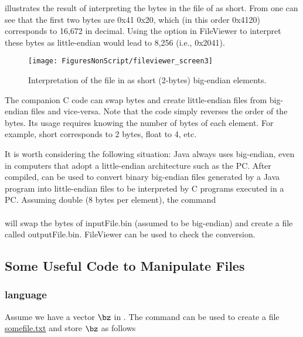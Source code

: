  illustrates the result of interpreting the bytes in the file of  as short. From  one can see that the first two bytes are 0x41 0x20, which (in this order 0x4120) corresponds to 16,672 in decimal. Using the option in FileViewer to interpret these bytes as little-endian would lead to 8,256 (i.e., 0x2041).

\begin{figure}
	\centering
		\texttt{[image: FiguresNonScript/fileviewer\_screen3]}		
	\caption{Interpretation of the file in  as short (2-bytes) big-endian elements.\label{fig:fileviewer_screen3}}
\end{figure}

The companion C code  can swap bytes and create little-endian files from big-endian files and vice-versa. Note that the code simply reverses the order of the bytes. Its usage requires knowing the number of bytes of each element. For example, short corresponds to 2 bytes, float to 4, etc.

It is worth considering the following situation: Java always uses big-endian, even in computers that adopt a little-endian architecture such as the PC. After compiled,  can be used to convert binary big-endian files generated by a Java program into little-endian files to be interpreted by C programs executed in a PC. Assuming double (8 bytes per element), the command\\
\\
will swap the bytes of inputFile.bin (assumed to be big-endian) and create a file called outputFile.bin. FileViewer can be used to check the conversion.

%

\subsection{Some Useful Code to Manipulate Files}

\subsubsection{{\matlab} language}
\label{app:matlab}

Assume we have a vector $\bz$ in {\matlab}. The command  can be used to create a file \url{somefile.txt} and store $\bz$ as follows\\

